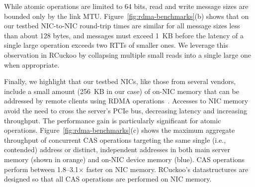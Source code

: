 
While atomic operations are limited to 64 bits, read and write message
sizes are bounded only by the link MTU.
Figure~\ref{fig:rdma-benchmarks}(b) shows that on our testbed
NIC-to-NIC round-trip times are similar for all message sizes
less than about 128 bytes, and
messages must exceed 1~KB before the latency of a single large operation
exceeds two RTTs of smaller ones.  We leverage this
observation in RCuckoo by collapsing multiple small reads into a single
large one when appropriate.


Finally, we highlight that our testbed NICs, like those from several
vendors, include a small amount (256~KB in our case) of on-NIC memory
that can be addressed by remote clients using RDMA
operations~\cite{device-memory}.  Accesses to NIC memory avoid the
need to cross the server's PCIe bus, decreasing latency and increasing
throughput.  The performance gain is particularly significant for
atomic operations.  Figure~\ref{fig:rdma-benchmarks}(c) shows the
maximum aggregate throughput of concurrent CAS operations targeting
the same single (i.e., contended) address or distinct, independent
addresses in both main server memory (shown in orange) and on-NIC
device memory (blue).  CAS operations perform between 1.8--3.1$\times$
faster on NIC memory.  RCuckoo's datastructures are designed so that
all CAS operations are performed on NIC memory.


